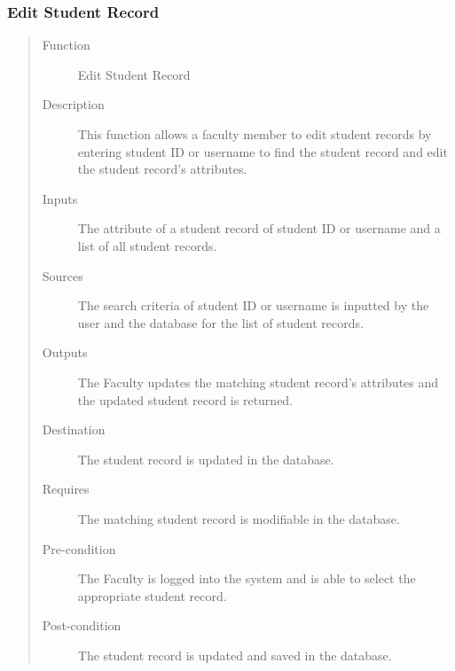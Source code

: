 \subsubsection{Edit Student Record} 
\begin{quote} %
\begin{description}
\item[Function]
   Edit Student Record
\item[Description]
   This function allows a faculty member to edit student records by entering
   student ID or username to find the student record and edit the student
   record's attributes.
\item[Inputs]
   The attribute of a student record of student ID or username and a list of all
   student records.
\item[Sources]
   The search criteria of student ID or username is inputted by the user and the
   database for the list of student records.
\item[Outputs]
   The Faculty updates the matching student record's attributes and the updated
   student record is returned.
\item[Destination]
   The student record is updated in the database.
\item[Requires]
   The matching student record is modifiable in the database.
\item[Pre-condition]
   The Faculty is logged into the system and is able to select the appropriate
   student record.
\item[Post-condition]
   The student record is updated and saved in the database.
\end{description}
\end{quote} %

